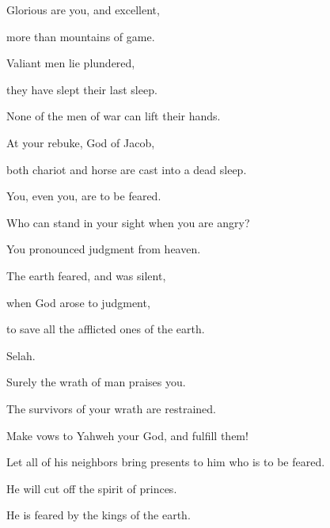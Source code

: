 {\Q {}Glorious are you, and excellent,
\par }{\QB more than mountains of game.
\par }{\Q {}Valiant men lie plundered,
\par }{\QB they have slept their last sleep.
\par }{\QB None of the men of war can lift their hands.
\par }{\Q {}At your rebuke, God of Jacob,
\par }{\QB both chariot and horse are cast into a dead sleep.
\par }{\Q {}You, even you, are to be feared.
\par }{\QB Who can stand in your sight when you are angry?
\par }{\Q {}You pronounced judgment from heaven.
\par }{\QB The earth feared, and was silent,
\par }{\QB {}when God arose to judgment,
\par }{\QB to save all the afflicted ones of the earth.
\par }{\QS Selah.\par }
{\Q {}Surely the wrath of man praises you.
\par }{\QB The survivors of your wrath are restrained.
\par }{\Q {}Make vows to Yahweh your God, and fulfill them!
\par }{\QB Let all of his neighbors bring presents to him who is to be feared.
\par }{\Q {}He will cut off the spirit of princes.
\par }{\QB He is feared by the kings of the earth.
\par }{\BB \par }
